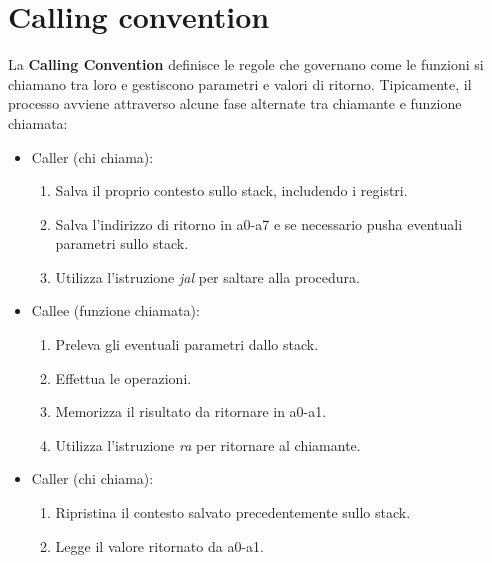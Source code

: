 \section{Calling convention}
La \textbf{Calling Convention} definisce le regole che governano come le funzioni si chiamano tra loro e gestiscono parametri e valori di ritorno. Tipicamente, il processo avviene attraverso alcune fase alternate tra chiamante e funzione chiamata:
\begin{itemize}
	\item Caller (chi chiama):
	\begin{enumerate}
		\item Salva il proprio contesto sullo stack, includendo i registri.
		\item Salva l'indirizzo di ritorno in a0-a7 e se necessario pusha eventuali parametri sullo stack.
		\item Utilizza l'istruzione \textit{jal} per saltare alla procedura.
	\end{enumerate}
	\item Callee (funzione chiamata):
	\begin{enumerate}
		\item Preleva gli eventuali parametri dallo stack.
		\item Effettua le operazioni.
		\item Memorizza il risultato da ritornare in a0-a1.
		\item Utilizza l'istruzione \textit{ra} per ritornare al chiamante.
	\end{enumerate}
	\item Caller (chi chiama):
		\begin{enumerate}
		\item Ripristina il contesto salvato precedentemente sullo stack.
		\item Legge il valore ritornato da a0-a1.
	\end{enumerate}
\end{itemize}

